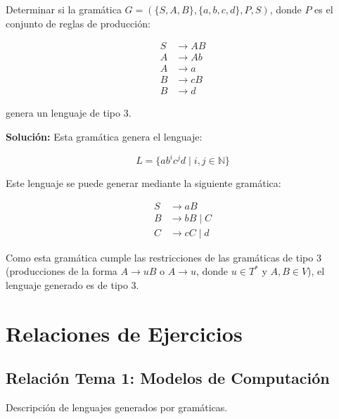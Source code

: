 \documentclass[12pt]{report} %
\begin{document}
\begin{ejercicioresuelto}
Determinar si la gramática \( G = (\{S, A, B\}, \{a, b, c, d\}, P, S) \), donde \( P \) es el conjunto de reglas de producción:

\[
\begin{aligned}
    S &\to AB \\
    A &\to Ab \\
    A &\to a \\
    B &\to cB \\
    B &\to d
\end{aligned}
\]

genera un lenguaje de tipo 3.

\textbf{Solución:} Esta gramática genera el lenguaje:

\[
L = \{ab^i c^j d \mid i, j \in \mathbb{N}\}
\]

Este lenguaje se puede generar mediante la siguiente gramática:

\[
\begin{aligned}
    S &\to aB \\
    B &\to bB \mid C \\
    C &\to cC \mid d
\end{aligned}
\]

Como esta gramática cumple las restricciones de las gramáticas de tipo 3 (producciones de la forma \( A \to uB \) o \( A \to u \), donde \( u \in T^* \) y \( A, B \in V \)), el lenguaje generado es de tipo 3.
\end{ejercicioresuelto}

\chapter{Relaciones de Ejercicios}

\hypertarget{relaciuxf3n-tema-1-modelos-de-computaciuxf3n}{%
\section{Relación Tema 1: Modelos de
Computación}\label{relaciuxf3n-tema-1-modelos-de-computaciuxf3n}}

\begin{ejercicio}
Descripción de lenguajes generados por gramáticas.
\end{ejercicio}
\end{document}
